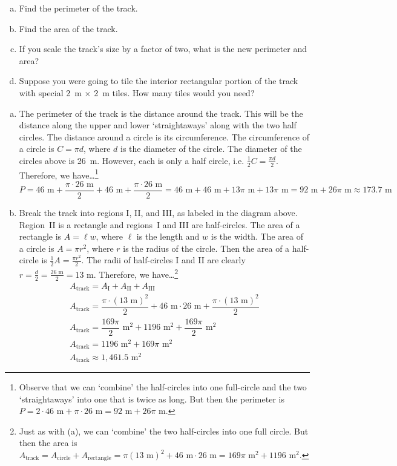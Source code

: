 \documentclass[11pt,letterpaper]{article}
\begin{document}
\begin{enumerate}[(a)]
\item Find the perimeter of the track.
\item Find the area of the track.
\item If you scale the track's size by a factor of two, what is the new perimeter and area?
\item Suppose you were going to tile the interior rectangular portion of the track with special 2~m $\times$ 2~m tiles. How many tiles would you need?
\end{enumerate} \pspace

\sol 
\begin{enumerate}[(a)]
\item The perimeter of the track is the distance around the track. This will be the distance along the upper and lower `straightaways' along with the two half circles. The distance around a circle is its circumference. The circumference of a circle is $C= \pi d$, where $d$ is the diameter of the circle. The diameter of the circles above is 26~m. However, each is only a half circle, i.e. $\frac{1}{2}C= \frac{\pi d}{2}$. Therefore, we have\dots\footnote{Observe that we can `combine' the half-circles into one full-circle and the two `straightaways' into one that is twice as long. But then the perimeter is $P= 2 \cdot 46 \text{ m} + \pi \cdot 26 \text{ m}= 92 \text{ m} + 26 \pi \text{ m}$.}
	\[
	P= 46 \text{ m} + \dfrac{\pi \cdot 26 \text{ m}}{2} + 46 \text{ m} + \dfrac{\pi \cdot 26 \text{ m}}{2}= 46 \text{ m} + 46 \text{ m} + 13\pi \text{ m} + 13 \pi \text{ m}= 92 \text{ m} + 26 \pi \text{ m} \approx 173.7 \text{ m}
	\] \pspace

\item Break the track into regions I, II, and III, as labeled in the diagram above. Region~II is a rectangle and regions~I and III are half-circles. The area of a rectangle is $A= \ell w$, where $\ell$ is the length and $w$ is the width. The area of a circle is $A= \pi r^2$, where $r$ is the radius of the circle. Then the area of a half-circle is $\frac{1}{2}A= \frac{\pi r^2}{2}$. The radii of half-circles I and II are clearly $r= \frac{d}{2}= \frac{26 \text{ m}}{2}= 13 \text{ m}$. Therefore, we have\dots\footnote{Just as with (a), we can `combine' the two half-circles into one full circle. But then the area is $A_{\text{track}}= A_{\text{circle}} + A_{\text{rectangle}}= \pi (13 \text{ m})^2 + 46 \text{ m} \cdot 26 \text{ m}= 169 \pi \text{ m}^2 + 1196 \text{ m}^2$.}
	\[
	\begin{gathered}
	A_{\text{track}}= A_{\text{I}} + A_{\text{II}} + A_{\text{III}} \\
	A_{\text{track}}= \dfrac{\pi \cdot (13 \text{ m})^2}{2} + 46 \text{ m} \cdot 26 \text{ m} + \dfrac{\pi \cdot (13 \text{ m})^2}{2} \\
	A_{\text{track}}= \dfrac{169 \pi}{2} \text{ m}^2 + 1196 \text{ m}^2 + \dfrac{169 \pi}{2} \text{ m}^2 \\
	A_{\text{track}}= 1196 \text{ m}^2 + 169 \pi \text{ m}^2 \\
	A_{\text{track}} \approx 1,\!461.5 \text{ m}^2
	\end{gathered}
	\] \pspace


\end{enumerate}
\end{document}
